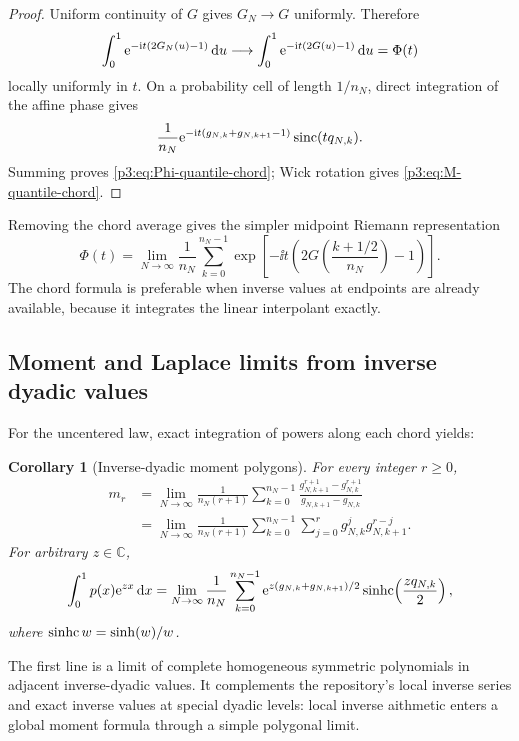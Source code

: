 \documentclass[11pt]{article}
\newtheorem{corollary}[theorem]{Corollary}
\theoremstyle{definition}
\theoremstyle{remark}
\newcommand{\C}{\mathbb C}
\newcommand{\dd}{\,\mathrm d}
\begin{document}
\begin{proof}
Uniform continuity of $G$ gives $G_N\to G$ uniformly.  Therefore
\[
 \int_0^1\e^{-\ii t(2G_N(u)-1)}\dd u
 \longrightarrow
 \int_0^1\e^{-\ii t(2G(u)-1)}\dd u=\Phi(t)
\]
locally uniformly in $t$.  On a probability cell of length $1/n_N$, direct
integration of the affine phase gives
\[
 \frac1{n_N}\mathrm e^{-\mathrm i t(g_{N,k}+g_{N,k+1}-1)}
 \operatorname{sinc}(tq_{N,k}).
\]
Summing proves \eqref{p3:eq:Phi-quantile-chord}; Wick rotation gives
\eqref{p3:eq:M-quantile-chord}.
\end{proof}

Removing the chord average gives the simpler midpoint Riemann representation
\begin{equation}\label{p3:eq:Phi-quantile-midpoint}
 \Phi(t)=\lim_{N\to\infty}\frac1{n_N}
 \sum_{k=0}^{n_N-1}
 \exp\!\left[-\ii t\left(2G\!\left(\frac{k+1/2}{n_N}\right)-1\right)\right].
\end{equation}
The chord formula is preferable when inverse values at endpoints are already
available, because it integrates the linear interpolant exactly.

\subsection{Moment and Laplace limits from inverse dyadic values}

For the uncentered law, exact integration of powers along each chord yields:

\begin{corollary}[Inverse-dyadic moment polygons]
\label{p3:cor:inverse-moment-polygons}
For every integer $r\ge0$,
\begin{align}
 m_r
 &=\lim_{N\to\infty}\frac1{n_N(r+1)}
 \sum_{k=0}^{n_N-1}
 \frac{g_{N,k+1}^{r+1}-g_{N,k}^{r+1}}
      {g_{N,k+1}-g_{N,k}}
 \label{p3:eq:moment-quantile-chord}\\
 &=\lim_{N\to\infty}\frac1{n_N(r+1)}
 \sum_{k=0}^{n_N-1}\sum_{j=0}^r
 g_{N,k}^{j}g_{N,k+1}^{r-j}.
 \label{p3:eq:moment-quantile-homogeneous}
\end{align}
For arbitrary $z\in\C$,
\begin{equation}\label{p3:eq:p-MGF-quantile-chord}
 \int_0^1p(x)\e^{zx}\dd x
 =\lim_{N\to\infty}\frac1{n_N}
 \sum_{k=0}^{n_N-1}
 \e^{z(g_{N,k}+g_{N,k+1})/2}
 \sinhc\!\left(\frac{zq_{N,k}}2\right),
\end{equation}
where $\operatorname{sinhc} w=\sinh(w)/w$.
\end{corollary}

The first line is a limit of complete homogeneous symmetric polynomials in
adjacent inverse-dyadic values.  It complements the repository's local inverse
series and exact inverse values at special dyadic levels: local inverse
aithmetic enters a global moment formula through a simple polygonal limit.
\end{document}
